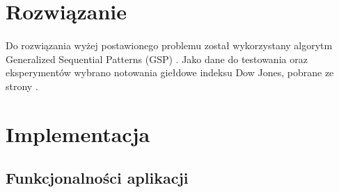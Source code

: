 \documentclass[11pt,a4paper]{article}
\begin{document}
\section{Rozwiązanie}
\label{sec:rozwiazanie}
\paragraph{} Do rozwiązania wyżej postawionego problemu został wykorzystany algorytm Generalized Sequential Patterns (GSP) \cite{bib:GSP}. Jako dane do testowania oraz eksperymentów wybrano notowania giełdowe indeksu Dow Jones, pobrane ze strony \cite{bib:DowJones}.

\section{Implementacja}

\subsection{Funkcjonalności aplikacji}
\end{document}
